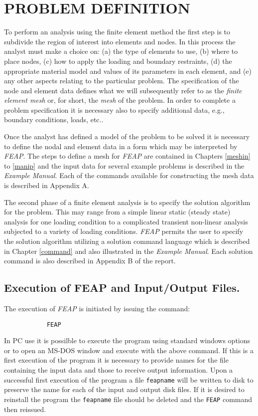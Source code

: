 \chapter[Problem Definition]{PROBLEM DEFINITION}
\label{def}

To perform an analysis using the finite element method the first step is
to subdivide the region of interest into elements and nodes.  In this
process the analyst must make a choice on: (a) the type of elements to
use, (b) where to place nodes, (c) how to apply the loading and
boundary restraints, (d) the appropriate material model
and values of its parameters in each element, and (e) any other aspects
relating to the particular problem.  The specification of the node and
element data defines what we will subsequently refer to as the
{\it finite element mesh} or, for short, the {\it mesh} of the problem.  
In order to complete a problem specification it is necessary also to
specify additional data, e.g., boundary conditions, loads, etc..

Once the analyst has defined a model of the problem to be solved it is 
necessary to  define the nodal and element data in a form
which may be interpreted by {\sl FEAP}.  The steps to define 
a mesh for {\sl FEAP}
are contained in Chapters \ref{meshin} to \ref{manip}
and the input data for several
example problems is described in the {\sl Example Manual}.
Each of the commands available for constructing the mesh data is described
in Appendix A.

The second phase of a finite element analysis is to specify the 
solution algorithm for the problem.  This may range from a simple
linear static (steady state)
analysis for one loading condition to a complicated transient
non-linear analysis subjected to a variety of loading conditions.  {\sl FEAP}
permits the user to specify the solution algorithm utilizing
a solution command language which is described in Chapter \ref{command} and
also illustrated in the {\sl Example Manual}.
Each solution command is also described in Appendix B of the report.

\section{Execution of FEAP and Input/Output Files.}

The execution of {\sl FEAP} is initiated by issuing the command:
\vskip 0.1in \par\noindent
\begin{verbatim}
            FEAP
\end{verbatim}
In PC use it is possilble to execute the program using standard windows options
or to open an MS-DOS window and execute with the above command.
If this is a first execution of the program it is necessary to
provide names for the file containing
the input data and those to receive output information.  Upon a successful first
execution of the program a file {\tt feapname} will be written to disk to
preserve the name for each of the input and output disk files.
If it is desired to reinstall the program the {\tt feapname}
file should be deleted and the {\tt FEAP} command then reissued.


